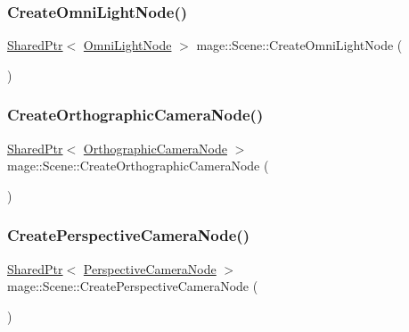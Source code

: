 \hypertarget{classmage_1_1_scene_a370f5ce63a6277a1369c1545f0acbffa}{}\label{classmage_1_1_scene_a370f5ce63a6277a1369c1545f0acbffa} 
\subsubsection{\texorpdfstring{Create\+Omni\+Light\+Node()}{CreateOmniLightNode()}}
{\footnotesize\ttfamily \hyperlink{namespacemage_a1e01ae66713838a7a67d30e44c67703e}{Shared\+Ptr}$<$ \hyperlink{namespacemage_a85082c7e15a2bbf19b1753b7de6c45db}{Omni\+Light\+Node} $>$ mage\+::\+Scene\+::\+Create\+Omni\+Light\+Node (\begin{DoxyParamCaption}{ }\end{DoxyParamCaption})}

\hypertarget{classmage_1_1_scene_a9ed9e3a611434f62427c7bd4c16d2456}{}\label{classmage_1_1_scene_a9ed9e3a611434f62427c7bd4c16d2456} 
\subsubsection{\texorpdfstring{Create\+Orthographic\+Camera\+Node()}{CreateOrthographicCameraNode()}}
{\footnotesize\ttfamily \hyperlink{namespacemage_a1e01ae66713838a7a67d30e44c67703e}{Shared\+Ptr}$<$ \hyperlink{namespacemage_a2ba71e84d4a4fb1e4a7160800c53f519}{Orthographic\+Camera\+Node} $>$ mage\+::\+Scene\+::\+Create\+Orthographic\+Camera\+Node (\begin{DoxyParamCaption}{ }\end{DoxyParamCaption})}

\hypertarget{classmage_1_1_scene_a3f4141d407133e6419af92376bc3ecc1}{}\label{classmage_1_1_scene_a3f4141d407133e6419af92376bc3ecc1} 
\subsubsection{\texorpdfstring{Create\+Perspective\+Camera\+Node()}{CreatePerspectiveCameraNode()}}
{\footnotesize\ttfamily \hyperlink{namespacemage_a1e01ae66713838a7a67d30e44c67703e}{Shared\+Ptr}$<$ \hyperlink{namespacemage_af3a338f28772b91cf6d7cb85df6f4bb9}{Perspective\+Camera\+Node} $>$ mage\+::\+Scene\+::\+Create\+Perspective\+Camera\+Node (\begin{DoxyParamCaption}{ }\end{DoxyParamCaption})}

